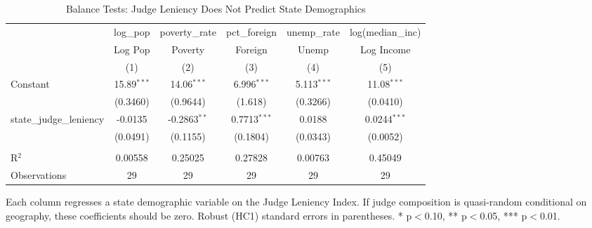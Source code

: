 \begin{table}[htbp]
   \caption{\label{tab:balance} Balance Tests: Judge Leniency Does Not Predict State Demographics}
   \bigskip
   \centering
   \begin{adjustbox}{max width=\textwidth}
   \begin{tabular}{lccccc}
      \toprule
                               & log\_pop      & poverty\_rate  & pct\_foreign   & unemp\_rate   & log(median\_inc)\\   
                               & Log Pop       & Poverty        & Foreign        & Unemp         & Log Income \\   
                               & (1)           & (2)            & (3)            & (4)           & (5)\\  
      \midrule 
      Constant                 & 15.89$^{***}$ & 14.06$^{***}$  & 6.996$^{***}$  & 5.113$^{***}$ & 11.08$^{***}$\\   
                               & (0.3460)      & (0.9644)       & (1.618)        & (0.3266)      & (0.0410)\\   
      state\_judge\_leniency   & -0.0135       & -0.2863$^{**}$ & 0.7713$^{***}$ & 0.0188        & 0.0244$^{***}$\\   
                               & (0.0491)      & (0.1155)       & (0.1804)       & (0.0343)      & (0.0052)\\   
       \\
      R$^2$                    & 0.00558       & 0.25025        & 0.27828        & 0.00763       & 0.45049\\  
      Observations             & 29            & 29             & 29             & 29            & 29\\  
      \bottomrule
   \end{tabular}
   \end{adjustbox}

   \par \raggedright
   Each column regresses a state demographic variable on the Judge Leniency Index. If judge composition is quasi-random conditional on geography, these coefficients should be zero. Robust (HC1) standard errors in parentheses. * p$<$0.10, ** p$<$0.05, *** p$<$0.01.
\end{table}
